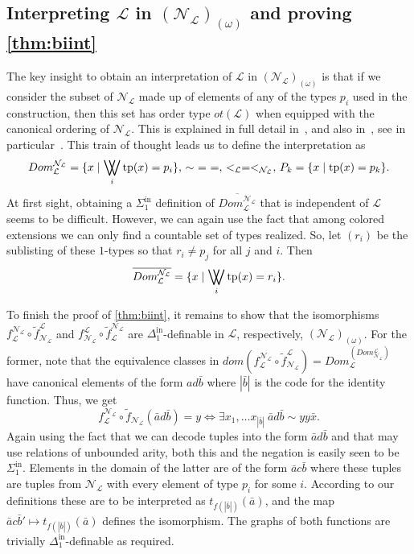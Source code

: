 \documentclass[11pt]{amsart}
\newcommand{\N}{\mathcal{N}}
\newcommand{\mc}[1]{\mathcal{#1}}
\newcommand{\Sinf}[1]{\Sigma^{\mathrm{in}}_{#1}}
\newcommand{\Dinf}[1]{\Delta^{\mathrm{in}}_{#1}}
\newcommand{\tp}{\mathrm{tp}}
\newcommand{\bigvvee}{%
	\mathop{
		\mathchoice{\bigvee\mkern-15mu\bigvee}
		{\bigvee\mkern-12.5mu\bigvee}
		{\bigvee\mkern-12.5mu\bigvee}
		{\bigvee\mkern-11mu\bigvee}
	}
}
\def\N{{\mathcal N}}
\theoremstyle{remark}
\begin{document}
\subsection{Interpreting $\mc{L}$ in $(\mc{N}_\mc{L})_{(\omega)}$ and proving \cref{thm:biint}}
The key insight to obtain an interpretation of $\mc{L}$ in $(\mc{N}_\mc{L})_{(\omega)}$ is that if we consider the subset of $\mc N_\mc L$ made up of elements of any of the types $p_i$ used in the construction, then this set has order type $ot(\mc{L})$ when equipped with the canonical ordering of $\mc N_\mc L$. This is explained in full detail in~\cite{MR23}, and also in~\cite[Section 3.3]{KS}, see in particular~\cite[Theorem 3.3.5]{KS}.
This train of thought leads us to define the interpretation as 
\[ Dom_\mc{L}^{\mc{N}_\mc{L}} = \{x\mid \bigvvee_i \tp(x)=p_i\},\, \sim~=~=,\,  <_\mc{L}=<_{\mc{N}_\mc{L}},\, P_k=\{x\mid  \tp(x)=p_k\}.\]
At first sight, obtaining a $\Sinf{1}$ definition of $\overline{Dom_{\mc{L}}^{\N_\mc{L}}}$ that is independent of $\mc{L}$ seems to be difficult. However, we can again use the fact that among colored extensions we can only find a countable set of types realized. So, let $(r_i)$ be the sublisting of these $1$-types so that $r_i\neq p_j$ for all $j$ and $i$. Then 
\[ \overline{Dom_\mc{L}^{\mc{N}_\mc{L}}}=\{ x\mid \bigvvee_{i} \tp(x)=r_i\}.\]

To finish the proof of \cref{thm:biint}, it remains to show that the isomorphisms $f_\mc{L}^{\N_\mc{L}}\circ \tilde{f}_{\N_\mc{L}}^\mc{L}$ and $f_{\N_\mc{L}}^\mc{L}\circ \tilde{f}_\mc{L}^{\N_\mc{L}}$ are $\Dinf{1}$-definable in $\mc{L}$, respectively, $(\N_\mc{L})_{(\omega)}$. For the former, note that the equivalence classes in $dom(f_\mc{L}^{\N_\mc{L}}\circ \tilde{f}_{\N_\mc{L}}^\mc{L})=Dom_\mathcal{L}^{(Dom_{\N_{\mc L}}^\mc{L})}$ have canonical elements of the form $ad\bar b$ where $|\bar b|$ is the code for the identity function. Thus, we get
\[f_\mc{L}^{\N_\mc{L}}\circ \tilde{f}_{\N_\mc{L}}(\bar ad\bar b)= y \iff\exists x_1,\dots x_{|\bar b|}\ \bar ad\bar b\sim yy\bar x.\]
Again using the fact that we can decode tuples into the form $\bar a d\bar b$ and that may use relations of unbounded arity, both this and the negation is easily seen to be $\Sinf{1}$.
 Elements in the domain of the latter are of the form $\bar a c \bar b$ where these tuples are tuples from $\N_\mc{L}$ with every element of type $p_i$ for some $i$. According to our definitions these are to be interpreted as $t_{f(|\bar b|)}(\bar a)$, and the map $\bar a c\bar b'\mapsto t_{f(|\bar b|)}(\bar a)$ defines the isomorphism. The graphs of both functions are trivially $\Dinf{1}$-definable as required.
\end{document}
